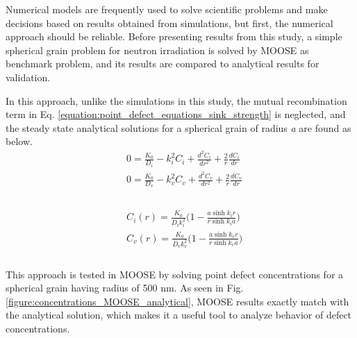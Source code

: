 \documentclass[utf8]{frontiersSCNS} %
\begin{document}
    Numerical models are frequently used to solve scientific problems and make decisions based on results obtained from simulations, but first, the numerical approach should be reliable. Before presenting results from this study, a simple spherical grain problem for neutron irradiation is solved by MOOSE as benchmark problem, and its results are compared to analytical results for validation.

    In this approach, unlike the simulations in this study, the mutual recombination term in Eq. \ref{equation:point_defect_equations_sink_strength} is neglected, and the steady state analytical solutions for a spherical grain of radius \textit{a} are found as below. \citep{heald1977}\\

    \begin{equation}
        \begin{aligned}
          &0 = \frac{K_0}{D_i} - k_i^2C_i + \frac{d^2C_i}{dr^2}+\frac{2}{r}\frac{dC_i}{dr}\\
          &0 = \frac{K_0}{D_v} - k_v^2C_v + \frac{d^2C_v}{dr^2}+\frac{2}{r}\frac{dC_v}{dr}\\
        \end{aligned}
        \label{equation:spherical_norecomb_point_defect_equations}
    \end{equation}\\

    \begin{equation}
        \begin{aligned}
          &C_i(r)=\frac{K_0}{D_ik_i^2}\bigg(1-\frac{a\sinh{k_ir}}{r\sinh{k_ia}}\bigg)\\
          &C_v(r)=\frac{K_0}{D_vk_v^2}\bigg(1-\frac{a\sinh{k_vr}}{r\sinh{k_va}}\bigg)\\
        \end{aligned}
        \label{equation:spherical_grain_analytical_solution}
    \end{equation}\\

    This approach is tested in MOOSE by solving point defect concentrations for a spherical grain having radius of 500 nm. As seen in Fig. \ref{figure:concentrations_MOOSE_analytical}, MOOSE results exactly match with the analytical solution, which makes it a useful tool to analyze behavior of defect concentrations.\\
\end{document}
